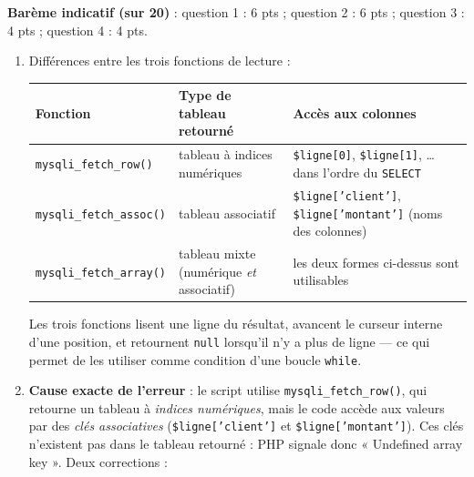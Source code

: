 \documentclass[11pt]{article}
\begin{document}
\begin{corrige}
\textbf{Barème indicatif (sur 20)} : question 1 : 6 pts ; question 2 : 6 pts ; question 3 : 4 pts ; question 4 : 4 pts.

\begin{enumerate}
\item Différences entre les trois fonctions de lecture :
\begin{center}
\begin{tabularx}{\linewidth}{|l|X|X|}
\hline
\rowcolor{popblueL} \textbf{Fonction} & \textbf{Type de tableau retourné} & \textbf{Accès aux colonnes} \\
\hline
\texttt{mysqli\_fetch\_row()} & tableau à indices numériques & \texttt{\$ligne[0]}, \texttt{\$ligne[1]}, \dots{} dans l'ordre du \texttt{SELECT} \\
\hline
\texttt{mysqli\_fetch\_assoc()} & tableau associatif & \texttt{\$ligne['client']}, \texttt{\$ligne['montant']} (noms des colonnes) \\
\hline
\texttt{mysqli\_fetch\_array()} & tableau mixte (numérique \emph{et} associatif) & les deux formes ci-dessus sont utilisables \\
\hline
\end{tabularx}
\end{center}
Les trois fonctions lisent une ligne du résultat, avancent le curseur interne d'une position, et retournent \texttt{null} lorsqu'il n'y a plus de ligne — ce qui permet de les utiliser comme condition d'une boucle \texttt{while}.
\item \textbf{Cause exacte de l'erreur} : le script utilise \texttt{mysqli\_fetch\_row()}, qui retourne un tableau à \emph{indices numériques}, mais le code accède aux valeurs par des \emph{clés associatives} (\texttt{\$ligne['client']} et \texttt{\$ligne['montant']}). Ces clés n'existent pas dans le tableau retourné : PHP signale donc « Undefined array key ». Deux corrections :


\end{enumerate}
\end{corrige}
\end{document}
